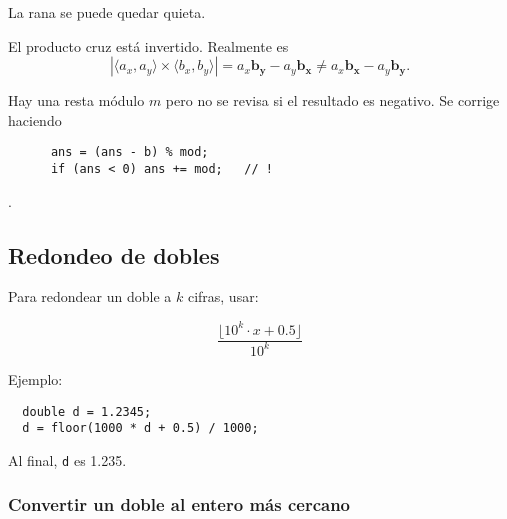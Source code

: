 \documentclass[10pt,letterpaper,twocolumn]{article}
\begin{document}
\begin{itemize}
  \begin{item}
    La rana se puede quedar quieta.
  \end{item}
  
  \begin{item}
    El producto cruz está invertido. Realmente es $$|\langle a_x, a_y \rangle \times \langle b_x, b_y\rangle| = a_x \mathbf{b_y} - a_y \mathbf{b_x} \neq a_x \mathbf{b_x} - a_y \mathbf{b_y}. $$
  \end{item}
  
  \begin{item}
      Hay una resta módulo $m$ pero no se revisa si el resultado es negativo. Se corrige haciendo \begin{verbatim}
      ans = (ans - b) % mod;
      if (ans < 0) ans += mod;   // !
\end{verbatim}.
  \end{item}
\end{itemize}

\subsection{Redondeo de dobles}

Para redondear un doble a $k$ cifras, usar:

$$ \dfrac{\lfloor 10^{k} \cdot x + 0.5 \rfloor }{10^k} $$

Ejemplo:
\begin{verbatim}
  double d = 1.2345;
  d = floor(1000 * d + 0.5) / 1000;
\end{verbatim}

Al final, \verb_d_ es 1.235.

\subsubsection{Convertir un doble al entero más cercano}
\end{document}
